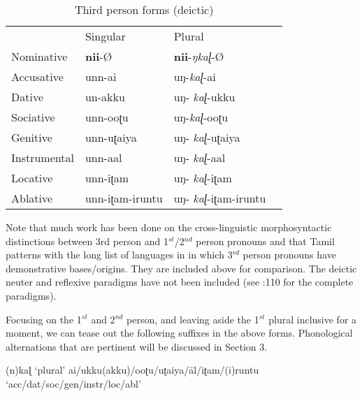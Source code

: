 \documentclass[output=paper,colorlinks,citecolor=brown,
]{langscibook}
\begin{document}
\begin{table}[]
    \centering
    \begin{tabular}{llll}
                 & Singular        & Plural              &  \\
    Nominative   & \textbf{nii}-Ø           & \textbf{nii}-\textit{ŋkaɭ}-Ø          &  \\
    Accusative   & unn-ai          & uŋ-\textit{kaɭ}-ai           &  \\
    Dative       & un-akku         & uŋ- \textit{kaɭ}-ukku        &  \\
    Sociative    & unn-ooʈu        & uŋ-\textit{kaɭ}-ooʈu         &  \\
    Genitive     & unn-uʈaiya      & uŋ- \textit{kaɭ}-uʈaiya      &  \\
    Instrumental & unn-aal         & uŋ- \textit{kaɭ}-aal         &  \\
    Locative     & unn-iʈam        & uŋ- \textit{kaɭ}-iʈam        &  \\
    Ablative     & unn-iʈam-iruntu & uŋ- \textit{kaɭ}-iʈam-iruntu & 
    \end{tabular}
    \caption{Third person forms (deictic) \citep{steever2019dravidian}}
    \label{new2c}
\end{table}

Note that much work has been done on the cross-linguistic morphosyntactic distinctions between 3rd person and 1$^{st}$/2$^{nd}$ person pronouns and that Tamil patterns with the long list of languages in \citet{harley2002person} in which 3$^{rd}$ person pronouns have demonstrative bases/origins. They are included above for comparison. The deictic neuter and reflexive paradigms have not been included (see \citet{steever2019dravidian}:110 for the complete paradigms). 

Focusing on the 1$^{st}$ and 2$^{nd}$ person, and leaving aside the 1$^{st}$ plural inclusive for a moment, we can tease out the following suffixes in the above forms. Phonological alternations that are pertinent will be discussed in Section 3.

\begin{exe}
\ex \label{new3}
\begin{xlist}
\ex \label{new3a}
(n)kaɭ \hspace{4cm} ‘plural’
\ex \label{new3b}
ai/ukku(akku)/ooʈu/uʈaiya/āl/iʈam/(i)runtu  \\ \hspace{9cm}  ‘acc/dat/soc/gen/instr/loc/abl’
\end{xlist}
\end{exe}
\end{document}

